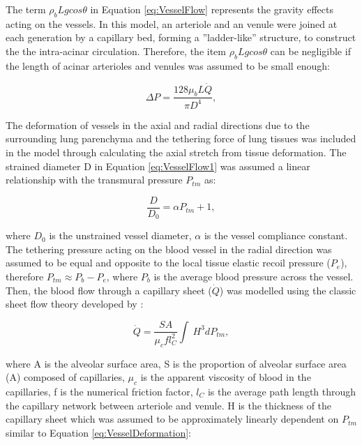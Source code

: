 The term $\rho_b Lgcos\theta$ in Equation \ref{eq:VesselFlow} represents the gravity effects acting on the vessels. In this model, an arteriole and an venule were joined at each generation by a capillary bed, forming a ''ladder-like'' structure, to construct the the intra-acinar circulation. Therefore, the item $\rho_b Lgcos\theta$ can be negligible if the length of acinar arterioles and venules was assumed to be small enough:

\begin{equation}
 \label{eq:VesselFlow1}
 \Delta P = \frac{128 \mu_bL\dot{Q}}{\pi D^{4}},
\end{equation}

The deformation of vessels in the axial and radial directions due to the surrounding lung parenchyma and the tethering force of lung tissues was included in the model through calculating the axial stretch from tissue deformation. The strained diameter D in Equation \ref{eq:VesselFlow1} was assumed a linear relationship with the transmural pressure $P_{tm}$ as:

\begin{equation}
 \label{eq:VesselDeformation}
 \frac{D}{D_0} = \alpha P_{tm} + 1,
\end{equation}

\noindent where $D_0$ is the unstrained vessel diameter, $\alpha$ is the vessel compliance constant. The tethering pressure acting on the blood vessel in the radial direction was assumed to be equal and opposite to the local tissue elastic recoil pressure ($P_e$), therefore $P_{tm} \approx P_b - P_e$, where $P_b$ is the average blood pressure across the vessel. Then, the blood flow through a capillary sheet ($\dot{Q}$) was modelled using the classic sheet flow theory developed by \cite{fung1969theory}:

\begin{equation}
 \label{eq:CapillarySheetFlow}
 \dot{Q} = \frac{SA}{\mu_c f l^{2}_{C}} \int\ H^{3}dP_{tm},
\end{equation}

\noindent where A is the alveolar surface area, S is the proportion of alveolar surface area (A) composed of capillaries, $\mu_c$ is the apparent viscosity of blood in the capillaries, f is the numerical friction factor, $l_C$ is the average path length through the capillary network between arteriole and venule. H is the thickness of the capillary sheet which was assumed to be approximately linearly dependent on $P_{tm}$ similar to Equation \ref{eq:VesselDeformation}:

